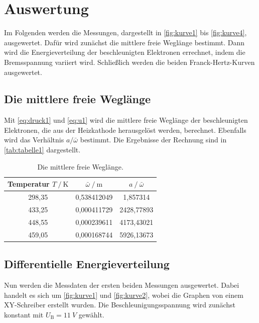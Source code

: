 \section{Auswertung}
\label{sec:Auswertung}

Im Folgenden werden die Messungen, dargestellt in \autoref{fig:kurve1} bis \autoref{fig:kurve4}, ausgewertet.
Dafür wird zunächst die mittlere freie Weglänge bestimmt.
Dann wird die Energieverteilung der beschleunigten Elektronen errechnet, indem die Bremsspannung variiert wird.
Schließlich werden die beiden Franck-Hertz-Kurven ausgewertet.


\subsection{Die mittlere freie Weglänge}
Mit \autoref{eq:druck1} und \autoref{eq:u1} wird die mittlere freie Weglänge der beschleunigten Elektronen,
die aus der Heizkathode herausgelöst werden, berechnet.
Ebenfalls wird das Verhältnis $a / \bar{\omega}$ bestimmt.
Die Ergebnisse der Rechnung sind in \autoref{tab:tabelle1} dargestellt.

\begin{table} [H]
  \centering
  \caption{Die mittlere freie Weglänge.}
  \label{tab:tabelle1}
  \begin{tabular}{c c c}
      \toprule
      Temperatur $T \mathbin{/} \unit\kelvin$ & $\bar{\omega} \mathbin{/} \unit\meter$ & $a \mathbin{/} \bar{\omega}$ \\
      \midrule 
      298,35 & 0,538412049 &  1,857314\\
      433,25 & 0,000411729 & 2428,77893\\
      448,55 & 0,000239611 & 4173,43021\\
      459,05 & 0,000168744 & 5926,13673\\
      \bottomrule
  \end{tabular}
\end{table}

\subsection{Differentielle Energieverteilung}
Nun werden die Messdaten der ersten beiden Messungen ausgewertet.
Dabei handelt es sich um \autoref{fig:kurve1} und \autoref{fig:kurve2}, wobei die Graphen von einem XY-Schreiber erstellt wurden.
Die Beschleunigungsspannung wird zunächst konstant mit $U_\text{B} = \qty{11}{V}$ gewählt.

